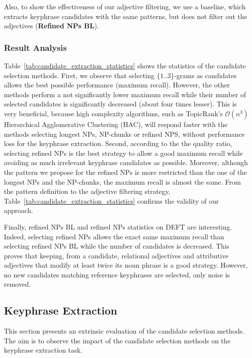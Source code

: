       Also, to show the effectiveness of our adjective filtering, we use a
      baseline, which extracts keyphrase candidates with the same patterns, but
      does not filter out the adjectives (\textbf{Refined NPs BL}).

    \subsubsection{Result Analysis}
    \label{subsubsec:candidate_extraction_result_analysis}
      Table~\ref{tab:candidate_extraction_statistics} shows the statistics of
      the candidate selection methods. First, we observe that selecting
      $\{1..3\}$-grams as candidates allows the best possible performance
      (maximum recall). However, the other methods perform  a not significantly
      lower maximum recall while their number of selected candidates is
      significantly decreased (about four times lesser). This is very
      beneficial, because high complexity algorithms, such as TopicRank's
      $\mathcal{O}(n^3)$ Hierarchical Agglomerative Clustering (HAC), will
      respond faster with the methods selecting longest NPs, NP-chunks or
      refined NPS, without performance loss for the keyphrase extraction.
      Second, according to the the quality ratio, selecting refined NPs is the
      best strategy to allow a good maximum recall while avoiding as much
      irrelevant keyphrase candidates as possible. Moreover, although the
      pattern we propose for the refined NPs is more restricted than the one of
      the longest NPs and the NP-chunks, the maximum recall is almost the same.
      From the pattern definition to the adjective filtering strategy,
      Table~\ref{tab:candidate_extraction_statistics} confirms the validity of
      our approach.

      Finally, refined NPs BL and refined NPs statistics on DEFT are
      interesting. Indeed, selecting refined NPs allows the exact same maximum
      recall than selecting refined NPs BL while the number of candidates is
      decreased. This proves that keeping, from a candidate, relational
      adjectives and attributive adjectives that modify at least twice its noun
      phrase is a good strategy. However, no new candidates matching reference
      keyphrases are selected, only noise is removed.

  \subsection{Keyphrase Extraction}
  \label{subsec:keyphrase_extraction}
    This section presents an extrinsic evaluation of the candidate selection
    methods. The aim is to observe the impact of the candidate selection
    methods on the keyphrase extraction task.

